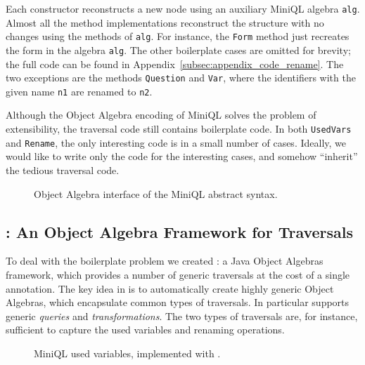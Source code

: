 
Each constructor reconstructs a new node using an auxiliary MiniQL algebra \lstinline{alg}.
Almost all the method implementations reconstruct the structure with
no changes using the methods of \lstinline{alg}. For instance, the \lstinline{Form} method just recreates the form in the algebra \lstinline{alg}. The other boilerplate cases are omitted for brevity; the full code can be found in
  Appendix~\ref{subsec:appendix_code_rename}. The two exceptions are the
methods \lstinline{Question} and \lstinline{Var}, where the identifiers with the given name \lstinline{n1} are renamed to \lstinline{n2}.

Although the Object Algebra encoding of MiniQL solves the problem of extensibility, the traversal code still contains boilerplate code.
In both \lstinline{UsedVars} and \lstinline{Rename}, the only interesting code
is in a small number of cases.  Ideally, we would like to write only
the code for the interesting cases, and somehow ``inherit'' the
tedious traversal code.

\begin{figure}[t]
\nocaptionrule
\caption{Object Algebra interface of the MiniQL abstract syntax.}
\vspace{-.1in}
\label{ql_tree}
\end{figure}

\subsection{\Name: An Object Algebra Framework for Traversals}

To deal with the boilerplate problem we created \Name: a Java Object
Algebras framework, which provides a number of generic traversals at
the cost of a single annotation. The key idea in \name is to
automatically create highly generic Object Algebras, which encapsulate
common types of traversals. In particular \name supports generic
\emph{queries} and \emph{transformations}. The two types of
traversals are, for instance,  sufficient to capture the used variables and
renaming operations.

\begin{figure}[t]
\nocaptionrule
\caption{MiniQL used variables, implemented with \Name.}
\label{usedvars_with_oaframework}
\end{figure}

